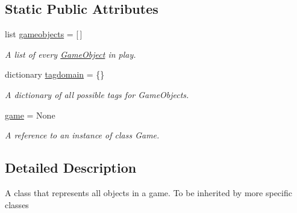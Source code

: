 \subsection*{\-Static \-Public \-Attributes}
\begin{DoxyCompactItemize}
\item 
\hypertarget{classGameObject_1_1GameObject_a819a11bfab91c2695bfc7f03d7f98fe8}{list \hyperlink{classGameObject_1_1GameObject_a819a11bfab91c2695bfc7f03d7f98fe8}{gameobjects} = \mbox{[}$\,$\mbox{]}}\label{classGameObject_1_1GameObject_a819a11bfab91c2695bfc7f03d7f98fe8}

\begin{DoxyCompactList}\small\item\em \-A list of every \hyperlink{classGameObject_1_1GameObject}{\-Game\-Object} in play. \end{DoxyCompactList}\item 
dictionary \hyperlink{classGameObject_1_1GameObject_a437572cf73cf761ce7c4e38472bd7015}{tagdomain} = \{\}
\begin{DoxyCompactList}\small\item\em \-A dictionary of all possible tags for \-Game\-Objects. \end{DoxyCompactList}\item 
\hyperlink{classGameObject_1_1GameObject_a61c6a263d89c17991e152fb828bd2da5}{game} = \-None
\begin{DoxyCompactList}\small\item\em \-A reference to an instance of class \-Game. \end{DoxyCompactList}\end{DoxyCompactItemize}


\subsection{\-Detailed \-Description}
\begin{DoxyVerb}A class that represents all objects in a game.
To be inherited by more specific classes
\end{DoxyVerb}
 

